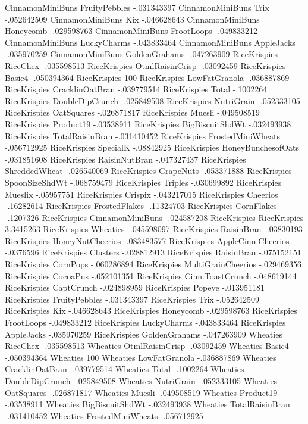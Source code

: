 CinnamonMiniBuns	FruityPebbles	-.031343397
CinnamonMiniBuns	Trix	-.052642509
CinnamonMiniBuns	Kix	-.046628643
CinnamonMiniBuns	Honeycomb	-.029598763
CinnamonMiniBuns	FrootLoops	-.049833212
CinnamonMiniBuns	LuckyCharms	-.043833464
CinnamonMiniBuns	AppleJacks	-.035970259
CinnamonMiniBuns	GoldenGrahams	-.047263909
RiceKrispies	RiceChex	-.035598513
RiceKrispies	OtmlRaisinCrisp	-.03092459
RiceKrispies	Basic4	-.050394364
RiceKrispies	100%
RiceKrispies	LowFatGranola	-.036887869
RiceKrispies	CracklinOatBran	-.039779514
RiceKrispies	Total	-.1002264
RiceKrispies	DoubleDipCrunch	-.025849508
RiceKrispies	NutriGrain	-.052333105
RiceKrispies	OatSquares	-.026871817
RiceKrispies	Muesli	-.049508519
RiceKrispies	Product19	-.03538911
RiceKrispies	BigBiscuitShdWt	-.032493938
RiceKrispies	TotalRaisinBran	-.031410452
RiceKrispies	FrostedMiniWheats	-.056712925
RiceKrispies	SpecialK	-.08842925
RiceKrispies	HoneyBunchesofOats	-.031851608
RiceKrispies	RaisinNutBran	-.047327437
RiceKrispies	ShreddedWheat	-.026540069
RiceKrispies	GrapeNuts	-.053371888
RiceKrispies	SpoonSizeShdWt	-.068759479
RiceKrispies	Triples	-.030699892
RiceKrispies	Mueslix	-.05957751
RiceKrispies	Crispix	-.043217015
RiceKrispies	Cheerios	-.16282614
RiceKrispies	FrostedFlakes	-.11324703
RiceKrispies	CornFlakes	-.1207326
RiceKrispies	CinnamonMiniBuns	-.024587208
RiceKrispies	RiceKrispies	3.3415263
RiceKrispies	Wheaties	-.045598097
RiceKrispies	RaisinBran	-.03830193
RiceKrispies	HoneyNutCheerios	-.083483577
RiceKrispies	AppleCinn.Cheerios	-.0376596
RiceKrispies	Clusters	-.028812913
RiceKrispies	RaisinBran	-.075152151
RiceKrispies	CornPops	-.060286894
RiceKrispies	MultiGrainCheerios	-.029469356
RiceKrispies	CocoaPus	-.052101351
RiceKrispies	Cinn.ToastCrunch	-.048619144
RiceKrispies	CaptCrunch	-.024898959
RiceKrispies	Popeye	-.013951181
RiceKrispies	FruityPebbles	-.031343397
RiceKrispies	Trix	-.052642509
RiceKrispies	Kix	-.046628643
RiceKrispies	Honeycomb	-.029598763
RiceKrispies	FrootLoops	-.049833212
RiceKrispies	LuckyCharms	-.043833464
RiceKrispies	AppleJacks	-.035970259
RiceKrispies	GoldenGrahams	-.047263909
Wheaties	RiceChex	-.035598513
Wheaties	OtmlRaisinCrisp	-.03092459
Wheaties	Basic4	-.050394364
Wheaties	100%
Wheaties	LowFatGranola	-.036887869
Wheaties	CracklinOatBran	-.039779514
Wheaties	Total	-.1002264
Wheaties	DoubleDipCrunch	-.025849508
Wheaties	NutriGrain	-.052333105
Wheaties	OatSquares	-.026871817
Wheaties	Muesli	-.049508519
Wheaties	Product19	-.03538911
Wheaties	BigBiscuitShdWt	-.032493938
Wheaties	TotalRaisinBran	-.031410452
Wheaties	FrostedMiniWheats	-.056712925
